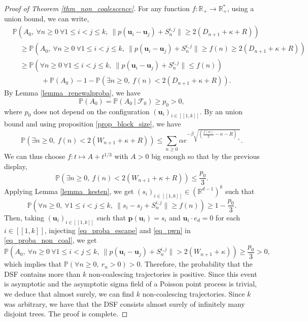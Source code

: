 \documentclass[a4paper, 11pt]{article}
\theoremstyle{plain}
\theoremstyle{definition}
\newcommand{\R}{\mathbb{R}}
\renewcommand{\P}{\mathbb{P}}
\newcommand{\range}[2]{[\![#1,#2]\!]}
\numberwithin{equation}{section}
\begin{document}
\begin{proof}[Proof of Theorem \ref{thm_non_coalescence}]
    For any function $f:\R_+\to\R_+^*$, using a union bound, we can write,
        \begin{equation}
            \label{eq_proba_non_coal}
            \begin{split}
                &\P(A_0,~\forall n\geq 0~\forall 1\leq i<j\leq k,~\|p(\mathbf u_i-\mathbf u_j)+S_n^{i,j}\|\geq 2(D_{n+1}+\kappa+R))\\
                &\quad\geq\P(A_0,~\forall n\geq 0~\forall 1\leq i<j\leq k,~\|p(\mathbf u_i-\mathbf u_j)+S_n^{i,j}\|\geq f(n)\geq 2(D_{n+1}+\kappa+R))\\
                &\quad\geq\P(\forall n\geq 0~\forall 1\leq i<j\leq k,~\|p(\mathbf u_i-\mathbf u_j)+S_n^{i,j}\|\leq f(n))\\
                &\qquad\quad\quad+\P(A_0)-1-\P(\exists n\geq 0,~f(n)<2(D_{n+1}+\kappa+R)).
            \end{split}
        \end{equation}
    By Lemma \ref{lemma_renewalproba}, we have
        \[\P(A_0)=\P(A_0~|~\mathcal F_0)\geq p_0>0,\]
    where $p_0$ does not depend on the configuration $(\mathbf u_i)_{i\in\range{1}{k}}$. By an union bound and using proposition \ref{prop_block_size}, we have
        \[\P(\exists n\geq 0,~f(n)<2(W_{n+1}+\kappa+R))\leq\sum_{n\geq 0}\alpha e^{-\beta \sqrt{\left(\frac{f(n)}{2}-\kappa-R\right)_+}}.\]
    We can thus choose $f:t\mapsto A+t^{1/3}$ with $A>0$ big enough so that by the previous display,
        \begin{equation}
            \label{eq_pwn}
            \P(\exists n\geq 0,~f(n)<2(W_{n+1}+\kappa+R))\leq\frac{p_0}{3}.
        \end{equation}
    Applying Lemma \ref{lemma_kesten}, we get $(s_i)_{i\in\range{1}{k}}\in(\R^{d-1})^k$ such that
        \begin{equation}
            \label{eq_proba_escape}
            \P(\forall n\geq0,~\forall 1\leq i<j\leq k,~\|s_i-s_j+S_n^{i, j}\|\geq f(n))\geq 1-\frac{p_0}{3}.
        \end{equation}
    Then, taking $(\mathbf u_i)_{i\in\range{1}{k}}$ such that $\mathbf p(\mathbf u_i)=s_i$ and $\mathbf u_i\cdot e_d=0$ for each $i\in\range{1}{k}$, injecting \eqref{eq_proba_escape} and \eqref{eq_pwn} in \eqref{eq_proba_non_coal}, we get
        \[\P(A_0,~\forall n\geq 0~\forall 1\leq i<j\leq k,~\|p(\mathbf u_i-\mathbf u_j)+S_n^{i,j}\|>2(W_{n+1}+\kappa))\geq\frac{p_0}{3}>0,\]
    which implies that $\P(\forall n\geq 0,~r_n>0)>0$. Therefore, the probability that the DSF contains more than $k$ non-coalescing trajectories is positive. Since this event is asymptotic and the asymptotic sigma field of a Poisson point process is trivial, we deduce that almost surely, we can find $k$ non-coalescing trajectories. Since $k$ was arbitrary, we have that the DSF consists almost surely of infinitely many disjoint trees. The proof is complete.
\end{proof}
\end{document}
